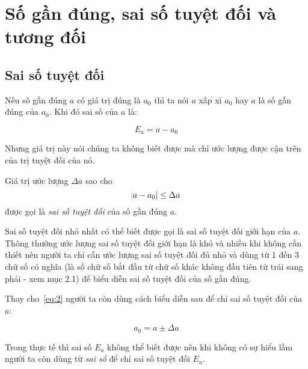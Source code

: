 \documentclass[../../Lectures.tex]{subfiles}
\begin{document}
\section{Số gần đúng, sai số tuyệt đối và tương đối}

\subsection{Sai số tuyệt đối}

Nếu số gần đúng \(a\) có giá trị đúng là \(a_0\) thì ta nói \(a\) xấp xỉ \(a_0\)
hay \(a\) là số gần đúng của \(a_0\). Khi đó sai số của \(a\) là:

\begin{equation} \label{eq:1}
    E_a = a - a_0
\end{equation}

Nhưng giá trị này nói chúng ta không biết được mà chỉ ước lượng được cận trên
của trị tuyệt đối của nó.

\begin{definition}
    Giá trị ước lượng \(\Delta a\) sao cho
    \begin{equation} \label{eq:2}
        \abs{a - a_0} \leq \Delta a
    \end{equation}
    được gọi là \emph{sai số tuyệt đối} của số gần đúng \(a\).
\end{definition}

Sai số tuyệt đối nhỏ nhất có thể biết được gọi là sai số tuyệt đối giới hạn của
\(a\). Thông thường ước lượng sai số tuyệt đối giới hạn là khó và nhiều khi
không cần thiết nên người ta chỉ cần ước lượng sai số tuyệt đối đủ nhỏ và dùng
từ 1 đến 3 chữ số có nghĩa (là số chữ số bắt đầu từ chữ số khác không đầu tiên
từ trái sang phải - xem mục 2.1) để biểu diễn sai số tuyệt đối của số gần đúng.

Thay cho~\ref{eq:2} người ta còn dùng cách biểu diễn sau để chỉ sai số tuyệt đối
của \(a\):

\begin{equation} \label{eq:3}
    a_0 = a \pm \Delta a
\end{equation}

Trong thực tế thì sai số \(E_a\) không thể biết được nên khi không có sự hiểu
lầm người ta còn dùng từ \emph{sai số} để chỉ sai số tuyệt đối \(E_a\).
\end{document}

